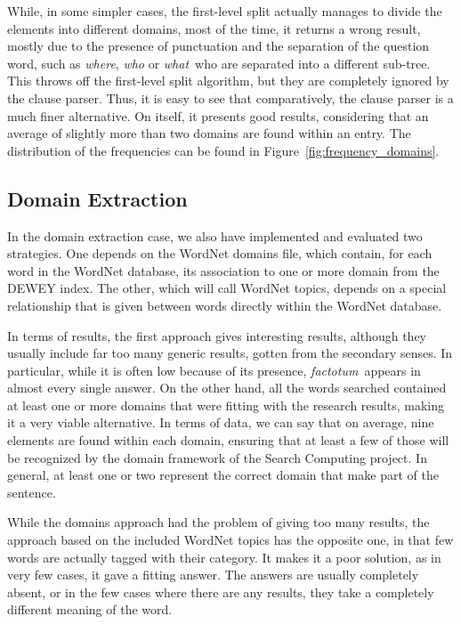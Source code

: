 While, in some simpler cases, the first-level split actually manages to divide the elements into different domains, most of the time, it returns a wrong result, mostly due to the presence of punctuation and the separation of the question word, such as \emph{where}, \emph{who} or \emph{what}\, who are separated into a different sub-tree. This throws off the first-level split algorithm, but they are completely ignored by the clause parser. Thus, it is easy to see that comparatively, the clause parser is a much finer alternative. On itself, it presents good results, considering that an average of slightly more than two domains are found within an entry. The distribution of the frequencies can be found in Figure~\ref{fig:frequency_domains}.


\subsection{Domain Extraction} %
\label{sub:domain_extraction}

In the domain extraction case, we also have implemented and evaluated two strategies. One depends on the WordNet domains file, which contain, for each word in the WordNet database, its association to one or more domain from the DEWEY index. The other, which will call WordNet topics, depends on a special relationship that is given between words  directly within the WordNet database.

In terms of results, the first approach gives interesting results, although they usually include far too many generic results, gotten from the secondary senses. In particular, while it is often low because of its presence, \emph{factotum}\ appears in almost every single answer. On the other hand, all the words searched contained at least one or more domains that were fitting with the research results, making it a very viable alternative. In terms of data, we can say that on average, nine elements are found within each domain, ensuring that at least a few of those will be recognized by the domain framework of the Search Computing project. In general, at least one or two represent the correct domain that make part of the sentence.

While the domains approach had the problem of giving too many results, the approach based on the included WordNet topics has the opposite one, in that few words are actually tagged with their category. It makes it a poor solution, as in very few cases, it gave a fitting answer. The answers are usually completely absent, or in the few cases where there are any results, they take a completely different meaning of the word.





